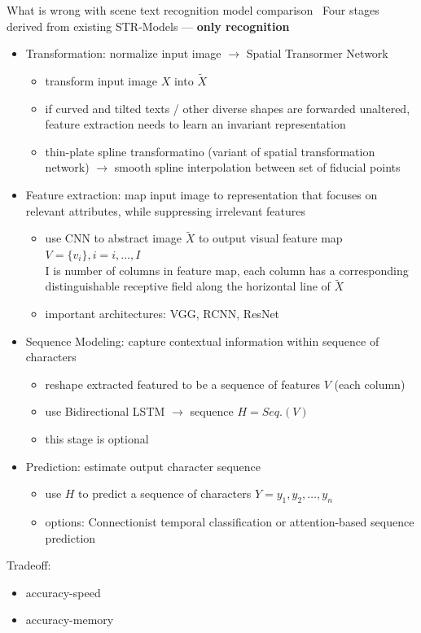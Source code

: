 What is wrong with scene text recognition model comparison~\cite{baek_what_2019}
Four stages derived from existing STR-Models --- \textbf{only recognition}
\begin{itemize}
    \item Transformation: normalize input image $\rightarrow$ Spatial Transormer Network
        \begin{itemize}
            \item transform input image $X$ into $\tilde{X}$
            \item if curved and tilted texts / other diverse shapes are forwarded unaltered,
                feature extraction needs to learn an invariant representation
            \item thin-plate spline transformatino (variant of spatial transformation network)
                $\rightarrow$ smooth spline interpolation between set of fiducial points
        \end{itemize}
    \item Feature extraction: map input image to representation that focuses on relevant attributes,
        while suppressing irrelevant features
        \begin{itemize}
            \item use \ac{CNN} to abstract image $\tilde{X}$ to output visual feature map
                $V=\{v_i\}, i=i,\ldots,I$\\
                I is number of columns in feature map, each column has a corresponding distinguishable
                receptive field along the horizontal line of $\tilde{X}$
            \item important architectures: VGG, RCNN, ResNet
        \end{itemize}
    \item Sequence Modeling: capture contextual information within sequence of characters
        \begin{itemize}
            \item reshape extracted featured to be a sequence of features $V$ (each column)
            \item use Bidirectional LSTM $\rightarrow$ sequence $H=Seq.(V)$
            \item this stage is optional
        \end{itemize}
    \item Prediction: estimate output character sequence
        \begin{itemize}
            \item use $H$ to predict a sequence of characters $Y=y_1,y_2,\ldots,y_n$
            \item options: Connectionist temporal classification or attention-based sequence prediction
        \end{itemize}
\end{itemize}
Tradeoff:
\begin{itemize}
    \item accuracy-speed
    \item accuracy-memory
\end{itemize}

